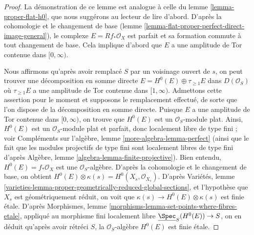 \begin{proof}
La démonstration de ce lemme est analogue à celle du
lemme \ref{lemma-proper-flat-h0},
que nous suggérons au lecteur de lire d'abord.
D'après la cohomologie et le changement de base
(lemme \ref{lemma-flat-proper-perfect-direct-image-general}),
le complexe $E = Rf_*\mathcal{O}_X$
est parfait et sa formation commute à tout changement de base.
Cela implique d'abord que $E$ a une amplitude de Tor contenue dans $[0, \infty)$.

\medskip\noindent
Nous affirmons qu'après avoir remplacé $S$ par un voisinage ouvert de
$s$, on peut trouver une décomposition en somme directe
$E = H^0(E) \oplus \tau_{\geq 1}E$ dans $D(\mathcal{O}_S)$
où $\tau_{\geq 1}E$ a une amplitude de Tor contenue dans $[1, \infty)$.
Admettons cette assertion pour le moment et supposons le remplacement effectué,
de sorte que l'on dispose de la décomposition en somme directe.
Puisque $E$ a une amplitude de Tor contenue dans $[0, \infty)$, on trouve que
$H^0(E)$ est un $\mathcal{O}_S$-module plat.
Ainsi, $H^0(E)$ est un $\mathcal{O}_S$-module plat et parfait,
donc localement libre de type fini ; voir
Compléments sur l'algèbre, lemme \ref{more-algebra-lemma-perfect}
(ainsi que le fait que les modules projectifs de type fini sont localement libres de type fini d'après
Algèbre, lemme \ref{algebra-lemma-finite-projective}).
Bien entendu, $H^0(E) = f_*\mathcal{O}_X$ est une $\mathcal{O}_S$-algèbre.
D'après la cohomologie et le changement de base, on obtient
$H^0(E) \otimes \kappa(s) = H^0(X_s, \mathcal{O}_{X_s})$.
D'après Variétés, lemme
\ref{varieties-lemma-proper-geometrically-reduced-global-sections},
et l'hypothèse que $X_s$ est géométriquement réduit, on
voit que $\kappa(s) \to H^0(E) \otimes \kappa(s)$
est finie \'etale. D'après Morphismes, lemme
\ref{morphisms-lemma-set-points-where-fibres-etale},
appliqué au morphisme fini localement libre
$\underline{\Spec}_S(H^0(E)) \to S$,
on en déduit qu'après avoir rétréci $S$, la $\mathcal{O}_S$-algèbre
$H^0(E)$ est finie \'etale.


\end{proof}
